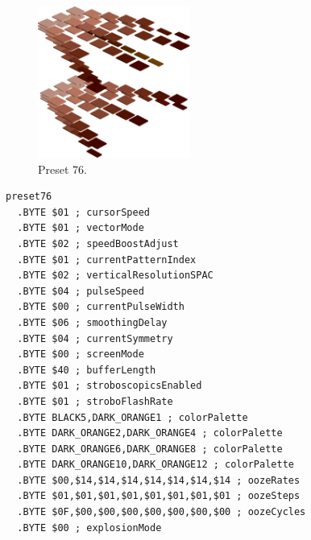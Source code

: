 \begin{minipage}[b]{0.48\linewidth}
\begin{figure}[H]                                                          
  \centering                                                             
  \begin{adjustbox}{width=5cm,center}                                   
  \includegraphics[width=5cm]{src/colorspace_presets/preset76-45.png}%
  \end{adjustbox}                                                        
\caption*{Preset 76.}                                           
\end{figure}                                                               
\end{minipage}
\hspace{0.1cm}
\begin{minipage}[b]{0.48\linewidth}                                       
\begin{lstlisting}[basicstyle=\ttfamily\tiny]
preset76
  .BYTE $01 ; cursorSpeed
  .BYTE $01 ; vectorMode
  .BYTE $02 ; speedBoostAdjust
  .BYTE $01 ; currentPatternIndex
  .BYTE $02 ; verticalResolutionSPAC
  .BYTE $04 ; pulseSpeed
  .BYTE $00 ; currentPulseWidth
  .BYTE $06 ; smoothingDelay
  .BYTE $04 ; currentSymmetry
  .BYTE $00 ; screenMode
  .BYTE $40 ; bufferLength
  .BYTE $01 ; stroboscopicsEnabled
  .BYTE $01 ; stroboFlashRate
  .BYTE BLACK5,DARK_ORANGE1 ; colorPalette
  .BYTE DARK_ORANGE2,DARK_ORANGE4 ; colorPalette
  .BYTE DARK_ORANGE6,DARK_ORANGE8 ; colorPalette
  .BYTE DARK_ORANGE10,DARK_ORANGE12 ; colorPalette
  .BYTE $00,$14,$14,$14,$14,$14,$14,$14 ; oozeRates
  .BYTE $01,$01,$01,$01,$01,$01,$01,$01 ; oozeSteps
  .BYTE $0F,$00,$00,$00,$00,$00,$00,$00 ; oozeCycles
  .BYTE $00 ; explosionMode
\end{lstlisting}
\end{minipage}

